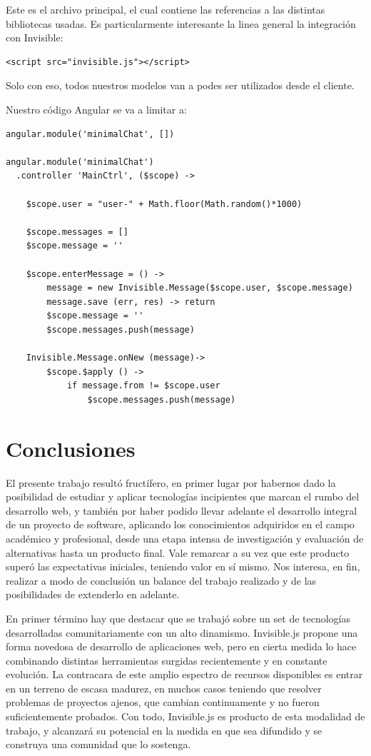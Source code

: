 \documentclass[doc,helv,longtable]{article}
\begin{document}
Este es el archivo principal, el cual contiene las referencias a las distintas bibliotecas usadas. Es particularmente interesante la linea general la integración con Invisible:

\begin{verbatim}
<script src="invisible.js"></script>
\end{verbatim}

Solo con eso, todos nuestros modelos van a podes ser utilizados desde el cliente.

Nuestro código Angular se va a limitar a:

\begin{verbatim}
angular.module('minimalChat', [])

angular.module('minimalChat')
  .controller 'MainCtrl', ($scope) ->

    $scope.user = "user-" + Math.floor(Math.random()*1000)

    $scope.messages = []
    $scope.message = ''

    $scope.enterMessage = () ->
        message = new Invisible.Message($scope.user, $scope.message)
        message.save (err, res) -> return
        $scope.message = ''
        $scope.messages.push(message)

    Invisible.Message.onNew (message)->
        $scope.$apply () ->
            if message.from != $scope.user
                $scope.messages.push(message)
\end{verbatim}

\section{Conclusiones}
El presente trabajo resultó fructífero, en primer lugar por habernos dado la posibilidad de estudiar y aplicar tecnologías incipientes que marcan el rumbo del desarrollo web, y también por haber podido llevar adelante el desarrollo integral de un proyecto de software, aplicando los conocimientos adquiridos en el campo académico y profesional, desde una etapa intensa de investigación y evaluación de alternativas hasta un producto final. Vale remarcar a su vez que este producto superó las expectativas iniciales, teniendo valor en sí mismo. Nos interesa, en fin, realizar a modo de conclusión un balance del trabajo realizado y de las posibilidades de extenderlo en adelante.

En primer término hay que destacar que se trabajó sobre un set de tecnologías desarrolladas comunitariamente con un alto dinamismo. Invisible.js propone una forma novedosa de desarrollo de aplicaciones web, pero en cierta medida lo hace combinando distintas herramientas surgidas recientemente y en constante evolución. La contracara de este amplio espectro de recursos disponibles es entrar en un terreno de escasa madurez, en muchos casos teniendo que resolver problemas de proyectos ajenos, que cambian continuamente y no fueron suficientemente probados. Con todo, Invisible.js es producto de esta modalidad de trabajo, y alcanzará su potencial en la medida en que sea difundido y se construya una comunidad que lo sostenga.
\end{document}
